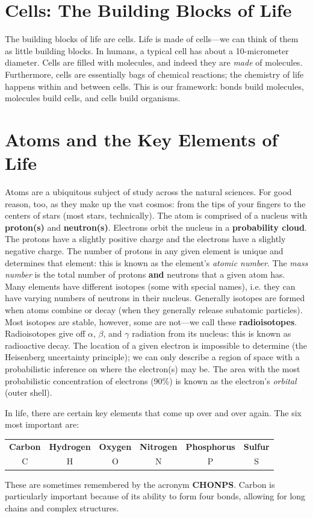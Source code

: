 \documentclass{report}
\begin{document}

\section{Cells: The Building Blocks of Life}

The building blocks of life are cells. Life is made of cells---we can think of them as little building blocks. In humans, a typical cell has about a 10-micrometer diameter. Cells are filled with molecules, and indeed they are \emph{made} of molecules. Furthermore, cells are essentially bags of chemical reactions; the chemistry of life happens within and between cells. This is our framework: bonds build molecules, molecules build cells, and cells build organisms.

\section{Atoms and the Key Elements of Life}

Atoms are a ubiquitous subject of study across the natural sciences. For good reason, too, as they make up the vast cosmos: from the tips of your fingers to the centers of stars (most stars, technically). The atom is comprised of a nucleus with \textbf{proton(s)} and \textbf{neutron(s)}. Electrons orbit the nucleus in a \textbf{probability cloud}. The protons have a slightly positive charge and the electrons have a slightly negative charge. The number of protons in any given element is unique and determines that element: this is known as the element's \emph{atomic number}. The \emph{mass number} is the total number of protons \textbf{and} neutrons that a given atom has. Many elements have different isotopes (some with special names), i.e. they can have varying numbers of neutrons in their nucleus. Generally isotopes are formed when atoms combine or decay (when they generally release subatomic particles). Most isotopes are stable, however, some are not---we call these \textbf{radioisotopes}. Radioisotopes give off \( \alpha  \), \( \beta  \), and \( \gamma  \) radiation from its nucleus: this is known as radioactive decay. The location of a given electron is impossible to determine (the Heisenberg uncertainty principle); we can only describe a region of space with a probabilistic inference on where the electron(s) may be. The area with the most probabilistic concentration of electrons (90\%) is known as the electron's \emph{orbital} (outer shell).

In life, there are certain key elements that come up over and over again. The six most important are:
\begin{center}
\begin{tabular}{cccccc}
\textbf{Carbon} & \textbf{Hydrogen} & \textbf{Oxygen} & \textbf{Nitrogen} & \textbf{Phosphorus} & \textbf{Sulfur} \\
C & H & O & N & P & S
\end{tabular}
\end{center}
These are sometimes remembered by the acronym \textbf{CHONPS}. Carbon is particularly important because of its ability to form four bonds, allowing for long chains and complex structures. 
\end{document}
